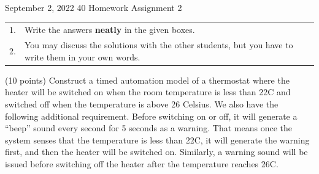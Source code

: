 \documentclass[a4paper, 12pt]{article}
\begin{document}

           {September 2, 2022}      					         		%
					 {40}											%
					 {Homework Assignment 2}							%
					
\begin{tabular}{cl}
1. & Write the answers \textbf{neatly} in the given boxes.\\
2. & You may  discuss the solutions with the other students, but you have to write them in your own words.\\
\end{tabular}


\begin{problem}{}
(10 points)  Construct a timed automation model of a thermostat where the heater will be switched on when the room temperature is less than 22C and switched off when the temperature is above 26 Celsius. We also have the following additional requirement. Before switching on or off, it will generate a ``beep'' sound every second for 5 seconds as a warning. That means once the system senses that the temperature is less than 22C, it will generate the warning first, and then the heater will be switched on. Similarly, a warning sound will be issued before switching off the heater after the temperature reaches 26C.


\noindent
\\
\\
\begin{minipage}{1\textwidth}
		\rectangle{\linewidth}{19cm}
\end{minipage}

\newpage
\ \\
\begin{minipage}{1\textwidth}
		\rectangle{\linewidth}{24cm}
\end{minipage}
\newpage
\ \\
\begin{minipage}{1\textwidth}
		\rectangle{\linewidth}{24cm}
\end{minipage}
\newpage
\ \\
\begin{minipage}{1\textwidth}
		\rectangle{\linewidth}{24cm}
\end{minipage}
\end{problem}
\end{document}
